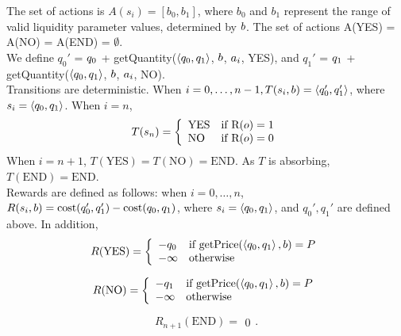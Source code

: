 The set of actions is $A(s_i) = [b_0, b_1]$, where $b_0$ and $b_1$ represent the range of valid liquidity parameter values, determined by $b$. The set of actions A(YES) = A(NO) = A(END) = $\emptyset$. \\

We define $q_0'$ = ${q_0}$ + getQuantity($\left<{q_0}, {q_1}\right>$, $b$, $a_i$, YES), and $q_1'$ = ${q_1}$ + getQuantity($\left<{q_0}, {q_1}\right>$, $b$, $a_i$, NO).\\

Transitions are deterministic. When $i=0, \ldots, n-1, T(s_i,b) = \left<q_0', q_1'\right>$, where $s_i = \left<{q_0}, {q_1}\right>$. When $i=n$,
\[ T(s_n) = \left\{
\begin{array}{ll}
      \text{YES} & \text{if R}(o) = 1 \\
      \text{NO} & \text{if R}(o) = 0 \\
\end{array} 
\right. \]
When $i=n+1$, 
$T(\text{YES}) = T(\text{NO}) = \text{END}$. As $T$ is absorbing, $T(\text{END}) = \text{END}$.\\


Rewards are defined as follows: when $i=0,\ldots,n$, $R(s_i,b) = \text{cost}(q_0', q_1') - \text{cost}({q_0}, {q_1})$, where $s_i = \left<{q_0}, {q_1}\right>$, and $q_0', q_1'$ are defined above. In addition,
\[ R(\text{YES}) =  \left\{
\begin{array}{ll}
      -{q_0} & \text{if getPrice}(\left<{q_0}, {q_1}\right>, b) = P \\
      -\infty & \text{otherwise} \\
\end{array} 
\right. \]

\[ R(\text{NO}) =  \left\{
\begin{array}{ll}
      -{q_1} & \text{if getPrice}(\left<{q_0}, {q_1}\right>, b) = P \\
      -\infty & \text{otherwise} \\
\end{array} 
\right. \]

\[ R_{n+1}(\text{END}) =
\begin{array}{ll}
      0
\end{array}. \]\\



